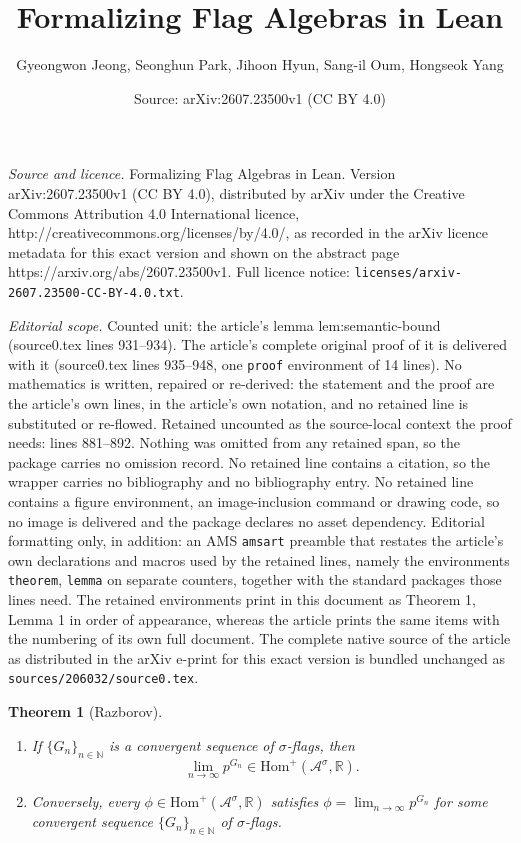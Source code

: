 \documentclass[10pt,a4paper]{amsart}
\title{Formalizing Flag Algebras in Lean}
\author{Gyeongwon Jeong, Seonghun Park, Jihoon Hyun, Sang-il Oum, Hongseok Yang}
\date{Source: arXiv:2607.23500v1 (CC BY 4.0)}
\newtheorem{theorem}{Theorem}
\newcommand{\poshom}[1]{\mathrm{Hom}^+(\mathcal{A}^{#1}, \mathbb{R})}
\begin{document}
\maketitle

\noindent\emph{Source and licence.} Formalizing Flag Algebras in Lean. Version arXiv:2607.23500v1 (CC BY 4.0), distributed by arXiv under the Creative Commons Attribution 4.0 International licence, http://creativecommons.org/licenses/by/4.0/, as recorded in the arXiv licence metadata for this exact version and shown on the abstract page https://arxiv.org/abs/2607.23500v1. Full licence notice: \texttt{licenses/arxiv-2607.23500-CC-BY-4.0.txt}.\par\smallskip

\noindent\textit{Editorial scope.} Counted unit: the article's lemma lem:semantic-bound (source0.tex lines 931--934). The article's complete original proof of it is delivered with it (source0.tex lines 935--948, one \texttt{proof} environment of 14 lines). No mathematics is written, repaired or re-derived: the statement and the proof are the article's own lines, in the article's own notation, and no retained line is substituted or re-flowed.  Retained uncounted as the source-local context the proof needs: lines 881--892.  Nothing was omitted from any retained span, so the package carries no omission record.  No retained line contains a citation, so the wrapper carries no bibliography and no bibliography entry.  No retained line contains a figure environment, an image-inclusion command or drawing code, so no image is delivered and the package declares no asset dependency.  Editorial formatting only, in addition: an AMS \texttt{amsart} preamble that restates the article's own declarations and macros used by the retained lines, namely the environments \texttt{theorem}, \texttt{lemma} on separate counters, together with the standard packages those lines need.  The retained environments print in this document as Theorem 1, Lemma 1 in order of appearance, whereas the article prints the same items with the numbering of its own full document.  The complete native source of the article as distributed in the arXiv e-print for this exact version is bundled unchanged as \texttt{sources/206032/source0.tex}.
\begin{theorem}[Razborov]\label{thm:convergent-hom}
  \begin{enumerate}
  \item[\textup{(a)}] If $\{G_n\}_{n\in\mathbb{N}}$ is a convergent sequence of
    $\sigma$-flags, then
    \[
      \lim_{n\to\infty} p^{G_n} \in \poshom{\sigma}.
    \]
  \item[\textup{(b)}] Conversely, every $\phi \in \poshom{\sigma}$ satisfies
    $\phi = \lim_{n\to\infty} p^{G_n}$ for some convergent sequence
    $\{G_n\}_{n\in\mathbb{N}}$ of $\sigma$-flags.
  \end{enumerate}
\end{theorem}
\end{document}
